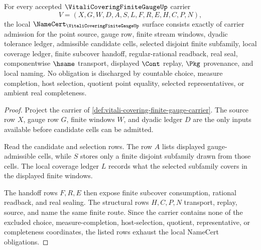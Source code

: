 \begin{theorem}
\label{thm:vitali-covering-finite-gauge-namecert-obligations}
For every accepted $\VitaliCoveringFiniteGaugeUp$ carrier
$$
V=(X,G,W,D,A,S,L,F,R,E,H,C,P,N),
$$
the local $\NameCert_{\VitaliCoveringFiniteGaugeUp}$ surface consists exactly of carrier admission for the point source, gauge row, finite stream windows, dyadic tolerance ledger, admissible candidate cells, selected disjoint finite subfamily, local coverage ledger, finite subcover handoff, regular-rational readback, real seal, componentwise $\hsame$ transport, displayed $\Cont$ replay, $\Pkg$ provenance, and local naming. No obligation is discharged by countable choice, measure completion, host selection, quotient point equality, selected representatives, or ambient real completeness.
\end{theorem}
\begin{proof}
Project the carrier of \autoref{def:vitali-covering-finite-gauge-carrier}. The source row $X$, gauge row $G$, finite windows $W$, and dyadic ledger $D$ are the only inputs available before candidate cells can be admitted.

Read the candidate and selection rows. The row $A$ lists displayed gauge-admissible cells, while $S$ stores only a finite disjoint subfamily drawn from those cells. The local coverage ledger $L$ records what the selected subfamily covers in the displayed finite windows.

The handoff rows $F,R,E$ then expose finite subcover consumption, rational readback, and real sealing. The structural rows $H,C,P,N$ transport, replay, source, and name the same finite route. Since the carrier contains none of the excluded choice, measure-completion, host-selection, quotient, representative, or completeness coordinates, the listed rows exhaust the local NameCert obligations.
\end{proof}

